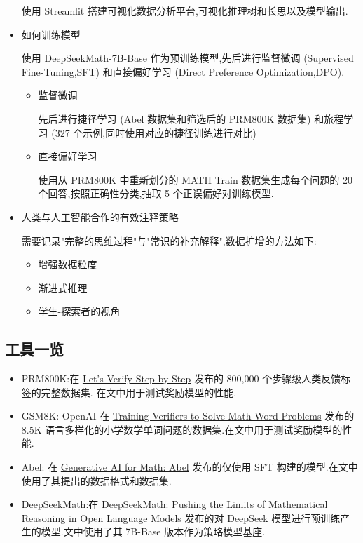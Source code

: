 \begin{itemize}
            使用 Streamlit 搭建可视化数据分析平台,可视化推理树和长思以及模型输出.
        \item 如何训练模型

            使用 DeepSeekMath-7B-Base 作为预训练模型,先后进行监督微调 (Supervised Fine-Tuning,SFT) 和直接偏好学习 (Direct Preference Optimization,DPO).
            \begin{itemize}
                \item 监督微调

                    先后进行捷径学习 (Abel 数据集和筛选后的 PRM800K 数据集) 和旅程学习 (327 个示例,同时使用对应的捷径训练进行对比)
                \item 直接偏好学习

                    使用从 PRM800K 中重新划分的 MATH Train 数据集生成每个问题的 20 个回答,按照正确性分类,抽取 5 个正误偏好对训练模型.
            \end{itemize}
        \item 人类与人工智能合作的有效注释策略

            需要记录"完整的思维过程"与"常识的补充解释",数据扩增的方法如下:
            \begin{itemize}
                \item 增强数据粒度
                \item 渐进式推理
                \item 学生-探索者的视角
            \end{itemize}
    \end{itemize}
    \subsection{工具一览}
    \begin{itemize}
        \item PRM800K:在 \href{https://openreview.net/forum?id=v8L0pN6EOi}{Let's Verify Step by Step} 发布的 800,000 个步骤级人类反馈标签的完整数据集. 在文中用于测试奖励模型的性能.
        \item GSM8K: OpenAI 在 \href{https://arxiv.org/abs/2110.14168}{Training Verifiers to Solve Math Word Problems} 发布的 8.5K 语言多样化的小学数学单词问题的数据集.在文中用于测试奖励模型的性能.
        \item Abel: 在 \href{https://github.com/GAIR-NLP/abel}{Generative AI for Math: Abel} 发布的仅使用 SFT 构建的模型.在文中使用了其提出的数据格式和数据集.
        \item DeepSeekMath:在 \href{https://arxiv.org/abs/2402.03300}{DeepSeekMath: Pushing the Limits of Mathematical Reasoning in Open Language Models} 发布的对 DeepSeek 模型进行预训练产生的模型.文中使用了其 7B-Base 版本作为策略模型基座.
    \end{itemize}


